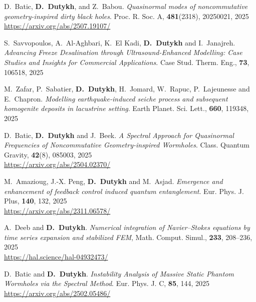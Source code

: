 \documentclass[final, a4paper, oneside, 12pt]{article}
\numberwithin{equation}{section}
\begin{document}
\begin{etaremune}
  \item D.~Batic, \textbf{D.~Dutykh}, and Z.~Babou. \textit{Quasinormal modes of noncommutative geometry-inspired dirty black holes}. Proc. R. Soc. A, \textbf{481}(2318), 20250021, 2025 \\ %
  \url{https://arxiv.org/abs/2507.19107/}

  \item S.~Savvopoulos, A.~Al-Aghbari, K.~El Kadi, \textbf{D.~Dutykh} and I.~Janajreh. \textit{Advancing Freeze Desalination through Ultrasound-Enhanced Modelling: Case Studies and Insights for Commercial Applications}. Case Stud. Therm. Eng., \textbf{73}, 106518, 2025 %

  \item M.~Zafar, P.~Sabatier, \textbf{D.~Dutykh}, H.~Jomard, W.~Rapuc, P.~Lajeunesse and E.~Chapron. \textit{Modelling earthquake-induced seiche process and subsequent homogenite deposits in lacustrine setting}. Earth Planet. Sci. Lett., \textbf{660}, 119348, 2025 %

  \item D.~Batic, \textbf{D.~Dutykh} and J.~Beek. \textit{A Spectral Approach for Quasinormal Frequencies of Noncommutative Geometry-inspired Wormholes}. Class. Quantum Gravity, \textbf{42}(8), 085003, 2025 \\ %
  \url{https://arxiv.org/abs/2504.02370/}

  \item M.~Amazioug, J.-X. Peng, \textbf{D.~Dutykh} and M.~Asjad. \textit{Emergence and enhancement of feedback control induced quantum entanglement}. Eur. Phys. J. Plus, \textbf{140}, 132, 2025 \\ %
  \url{https://arxiv.org/abs/2311.06578/}

  \item A.~Deeb and \textbf{D.~Dutykh}. \textit{Numerical integration of Navier--Stokes equations by time series expansion and stabilized FEM}, Math. Comput. Simul., \textbf{233}, 208--236, 2025 \\ %
  \url{https://hal.science/hal-04932473/}

  \item D.~Batic and \textbf{D.~Dutykh}. \textit{Instability Analysis of Massive Static Phantom Wormholes via the Spectral Method}. Eur. Phys. J. C, \textbf{85}, 144, 2025 \\ %
  \url{https://arxiv.org/abs/2502.05486/}


\end{etaremune}
\end{document}

